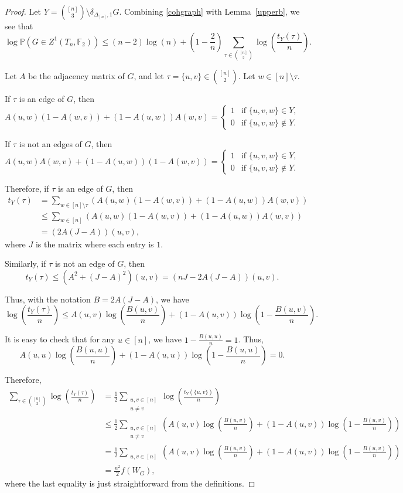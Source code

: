 \documentclass[11pt,a4paper]{article}
\theoremstyle{plain}
\theoremstyle{definition}
\begin{document}
\begin{proof}
Let $Y={{[n]}\choose 3}\setminus\delta_{\Delta_{[n]},1} G$. Combining \eqref{cohgraph} with Lemma~\ref{upperb}, we see that
\begin{equation}\label{eq11}\log \mathbb{P}(G\in Z^1(T_n,\mathbb{F}_2))\le (n-2)\log (n)+\left(1-\frac{2}n\right)\sum_{\tau\in {{[n]}\choose{2}}} \log\left(\frac{t_Y(\tau)}{n}\right).\end{equation}

Let $A$ be the adjacency matrix of $G$, and let $\tau=\{u,v\}\in {{[n]}\choose{2}}$. Let $w\in [n]\setminus \tau$. 

If $\tau$ is an edge of $G$, then
\[A(u,w)(1-A(w,v))+(1-A(u,w))A(w,v)=\begin{cases} 1&\text{if }\{u,v,w\}\in Y,\\
0&\text{if }\{u,v,w\}\notin Y.
\end{cases}\]

If $\tau$ is not an edges of $G$, then 
\[A(u,w)A(w,v)+(1-A(u,w))(1-A(w,v))=\begin{cases} 1&\text{if }\{u,v,w\}\in Y,\\
0&\text{if }\{u,v,w\}\notin Y.
\end{cases}\]

Therefore, if $\tau$ is an edge of $G$, then
\begin{align*}t_Y(\tau)&=\sum_{w\in [n]\setminus \tau} \left(A(u,w)(1-A(w,v))+(1-A(u,w))A(w,v)\right)\\&\le \sum_{w\in [n]} \left(A(u,w)(1-A(w,v))+(1-A(u,w))A(w,v)\right)\\&=(2A(J-A))(u,v), 
\end{align*}
where $J$ is the matrix where each entry is $1$.

Similarly, if $\tau$ is not an edge of $G$, then
\[t_Y(\tau)\le (A^2+(J-A)^2)(u,v)=(nJ-2A(J-A))(u,v).\]

Thus, with the notation $B=2A(J-A)$, we have
\[\log\left(\frac{t_Y(\tau)}{n}\right)\le A(u,v)\log\left(\frac{B(u,v)}{n}\right)+(1-A(u,v))\log\left(1-\frac{B(u,v)}{n}\right).\]

It is easy to check that for any $u\in [n]$, we have $1-\frac{B(u,u)}{n}=1$. Thus,
\[A(u,u)\log\left(\frac{B(u,u)}{n}\right)+(1-A(u,u))\log\left(1-\frac{B(u,u)}{n}\right)=0.\]

Therefore,
\begin{align}\label{eq12}
\sum_{\tau\in{{[n]}\choose{2}}} \log\left(\frac{t_Y(\tau)}{n}\right)&=\frac{1}2\sum_{\substack{u,v\in [n]\\u\neq v}}\log\left(\frac{t_Y(\{u,v\})}{n}\right)\\&\le \frac{1}2\sum_{\substack{u,v\in [n]\\u\neq v}} \left(A(u,v)\log\left(\frac{B(u,v)}{n}\right)+(1-A(u,v))\log\left(1-\frac{B(u,v)}{n}\right)\right)\nonumber\\&=\frac{1}2\sum_{\substack{u,v\in [n]}}\left( A(u,v)\log\left(\frac{B(u,v)}{n}\right)+(1-A(u,v))\log\left(1-\frac{B(u,v)}{n}\right)\right)\nonumber\\&=\frac{n^2}2 f(W_G),\nonumber
\end{align}
where the last equality is just straightforward from the definitions.


\end{proof}
\end{document}
